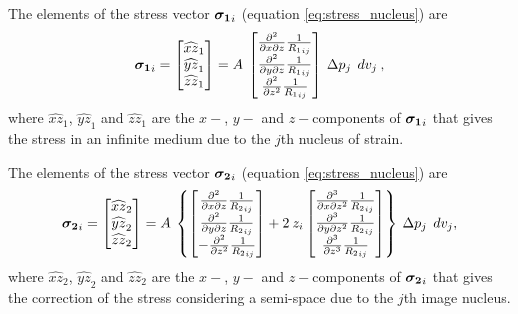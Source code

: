 \documentclass[journal abbreviation, manuscript]{copernicus}
\begin{document}
The elements  of the stress vector $\mbox{\boldmath$\sigma_{1}$}_{i}$ (equation \ref{eq:stress_nucleus}) are
\begin{equation}
\mbox{\boldmath$\sigma_{1}$}_{i}  = 
\begin{bmatrix} 
{\widehat{xz}_{1}} \\
{\widehat{yz}_{1}}  \\
{\widehat{zz}_{1}} 
\end{bmatrix}
 = A  \: 
\begin{bmatrix} 
\frac{\partial^{2} }{\partial x \partial z} {\frac{1}{{R_1}_{ij}}}  \\
\frac{\partial^{2} }{\partial y \partial z} {\frac{1}{{R_1}_{ij}}}  \\
\frac{\partial^{2} }{\partial z^{2}} {\frac{1}{{R_1}_{ij}}} 
\end{bmatrix}
 \: \Delta p_{j} \: \:dv_j \:  ,  
\label{eq:nucleus-stress1-vector}
\end{equation}
where ${\widehat{xz}_{1}}$, ${\widehat{yz}_{1}}$ and ${\widehat{zz}_{1}}$ are the $x-$, $y-$  and $z-$components
of  $\mbox{\boldmath$\sigma_{1}$}_{i}$ that gives the stress in an infinite medium due to the $j$th nucleus of strain.

The elements  of the stress vector $\mbox{\boldmath$\sigma_{2}$}_{i}$ (equation \ref{eq:stress_nucleus}) are
\begin{equation}
\mbox{\boldmath$\sigma_{2}$}_{i}  = 
\begin{bmatrix} 
{\widehat{xz}_{2}} \\
{\widehat{yz}_{2}}  \\
{\widehat{zz}_{2}} 
\end{bmatrix}
= A  \: 
\left\{
\begin{bmatrix} 
\frac{\partial^{2}  }{\partial x \partial z} {\frac{1}{{R_2}_{ij}}} \\
\frac{\partial^{2} }{\partial y \partial z} {\frac{1}{{R_2}_{ij}}} \\
- \frac{\partial^{2} }{\partial z^{2}} {\frac{1}{{R_2}_{ij}}}   
\end{bmatrix}
+ 2 \: z_{i}
\begin{bmatrix} 
\frac{\partial^{3}  }{\partial x \partial z^{2}} {\frac{1}{{R_2}_{ij}}} \\
\frac{\partial^{3} }{\partial y \partial z^{2}} {\frac{1}{{R_2}_{ij}}} \\
\frac{\partial^{3} }{\partial z^{3}} {\frac{1}{{R_2}_{ij}}} 
\end{bmatrix}
\right\}
\: \Delta p_{j} \: \:dv_j,
\label{eq:nucleus-stress2-vector}
\end{equation}
where ${\widehat{xz}_{2}}$, ${\widehat{yz}_{2}}$ and ${\widehat{zz}_{2}}$ are the $x-$, $y-$  and $z-$components
of  $\mbox{\boldmath$\sigma_{2}$}_{i}$ that gives the correction of the stress considering  a semi-space due to the $j$th image nucleus.
\end{document}
